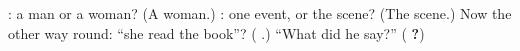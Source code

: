 \begin{tcolorbox}[breakable,colback=teal!4,colframe=teal!35!black,title={Before you move on}]
\textbf{}: a man or a woman? (A woman.) \textbf{  }: one event, or the scene? (The scene.) Now the other way round: \textquotedblleft{}she read the book\textquotedblright{}? (\textbf{  }.) \textquotedblleft{}What did he say?\textquotedblright{} (\textbf{  ?})
\end{tcolorbox}
